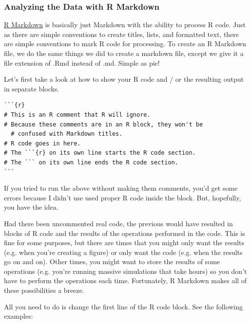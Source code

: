 \documentclass[12pt]{article}
\begin{document}
\subsubsection{Analyzing the Data with R Markdown}
\href{http://rmarkdown.rstudio.com/}{R Markdown} is basically just Markdown with the
ability to process R code. Just as there are simple conventions to create titles,
lists, and formatted text, there are simple conventions to mark R code for processing.
To create an R Markdown file, we do the same things we did to create a markdown file,
except we give it a file extension of .Rmd instead of .md. Simple as pie!

Let's first take a look at how to show your R code and / or the resulting output in
separate blocks.

\begin{verbatim}
```{r}
# This is an R comment that R will ignore.
# Because these comments are in an R block, they won't be
  # confused with Markdown titles.
# R code goes in here.
# The ```{r} on its own line starts the R code section.
# The ``` on its own line ends the R code section.
```
\end{verbatim}

If you tried to run the above without making them comments, you'd get some errors because
I didn't use used proper R code inside the block. But, hopefully, you have the idea.

Had there been uncommented real code, the previous would
have resulted in blocks of R code and the results of the operations performed in
the code. This is fine for some purposes, but there are times that you might only
want the results (e.g. when you're creating a figure) or only want the code (e.g. when
the results go on and on). Other times, you might want to store the results of some
operations (e.g. you're running massive simulations that take hours) so you don't 
have to perform the operations each time. Fortunately, R Markdown makes all of these
possibilities a breeze.

All you need to do is change the first line of the R code block. See the following
examples:
\end{document}
